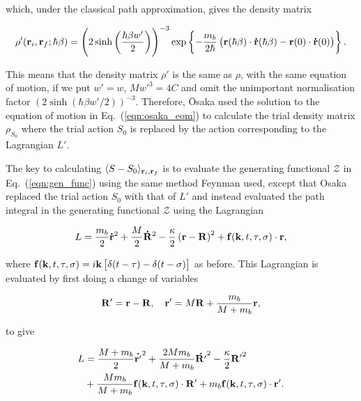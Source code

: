 which, under the classical path approximation, gives the density matrix

\begin{equation}
    \rho'(\vb{r}_i, \vb{r}_f; \hbar\beta) = \left(2 \sinh\left(\frac{\hbar\beta w'}{2}\right)\right)^{-3} \exp \left\{-\frac{m_b}{2\hbar}\left( \vb{r}(\hbar\beta) \cdot \vb{\dot{r}}(\hbar\beta) - \vb{r}(0) \cdot \vb{\dot{r}}(0) \right)\right\}.
\end{equation}

This means that the density matrix $\rho'$ is the same as $\rho$, with the same equation of motion, if we put $w' = w$, $Mw'^3 = 4C$ and omit the unimportant normalisation factor $(2 \sinh (\hbar \beta w' / 2))^{-3}$. Therefore, \=Osaka used the solution to the equation of motion in Eq.~(\ref{eqn:osaka_eom}) to calculate the trial density matrix $\rho_{S_0}$ where the trial action $S_0$ is replaced by the action corresponding to the Lagrangian $L'$. 

The key to calculating $\langle S - S_0 \rangle_{\vb{r}_i, \vb{r}_f}$ is to evaluate the generating functional $\mathcal{Z}$ in Eq.~(\ref{eqn:gen_func}) using the same method Feynman used, except that Osaka replaced the trial action $S_0$ with that of $L'$ and instead evaluated the path integral in the generating functional $\mathcal{Z}$ using the Lagrangian

\begin{equation}\label{eqn:osaka_lag_f}
    L = \frac{m_b}{2} \vb{\dot{r}}^2 + \frac{M}{2}\vb{\dot{R}}^2 - \frac{\kappa}{2} \left( \vb{r} - \vb{R} \right)^2 + \vb{f}(\vb{k}, t, \tau, \sigma) \cdot \vb{r},
\end{equation}

where $\vb{f}(\vb{k}, t, \tau, \sigma) = i \vb{k} \left[ \delta(t-\tau) - \delta(t-\sigma) \right]$ as before. This Lagrangian is evaluated by first doing a change of variables

\begin{equation}
    \vb{R'} = \vb{r} - \vb{R}, \quad \vb{r'} = M \vb{R} + \frac{m_b}{M + m_b} \vb{r},
\end{equation}

to give

\begin{equation}
    \begin{aligned}
        L &= \frac{M+m_b}{2} \vb{\dot{r'}}^2 + \frac{2M m_b}{M+m_b} \vb{\dot{R'}}^2 - \frac{\kappa}{2}\vb{R'}^2 \\
        &+\frac{M m_b}{M+m_b} \vb{f}(\vb{k}, t, \tau, \sigma) \cdot \vb{R'} + m_b \vb{f}(\vb{k}, t, \tau, \sigma) \cdot \vb{r'}.
    \end{aligned}
\end{equation}

